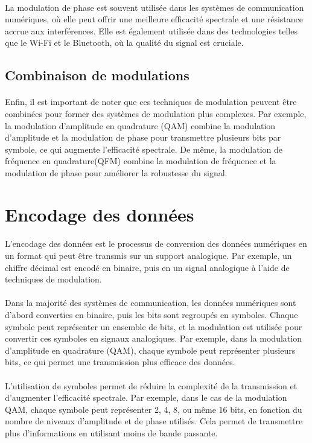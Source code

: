 \documentclass[a4paper,twocolumn]{report}
\begin{document}
\paragraph{}La modulation de phase est souvent utilisée dans les systèmes de communication numériques,
où elle peut offrir une meilleure efficacité spectrale et une résistance accrue aux interférences.
Elle est également utilisée dans des technologies telles que le Wi-Fi et le Bluetooth,
où la qualité du signal est cruciale.

\subsection{Combinaison de modulations}
\paragraph{}Enfin, il est important de noter que ces techniques de modulation peuvent
être combinées pour former des systèmes de modulation plus complexes.
Par exemple, la modulation d'amplitude en quadrature (QAM) combine la modulation
d'amplitude et la modulation de phase pour transmettre plusieurs bits par symbole,
ce qui augmente l'efficacité spectrale. De même, la modulation de fréquence en quadrature(QFM)
combine la modulation de fréquence et la modulation de phase pour améliorer la robustesse du signal.

\section{Encodage des données}

\paragraph{}L'encodage des données est le processus de conversion des données numériques
en un format qui peut être transmis sur un support analogique.
Par exemple, un chiffre décimal est encodé en binaire, puis en un signal 
analogique à l'aide de techniques de modulation.
\paragraph{}Dans la majorité des systèmes de communication, les données numériques
sont d'abord converties en binaire, puis les bits sont regroupés en symboles.
Chaque symbole peut représenter un ensemble de bits, et la modulation est utilisée
pour convertir ces symboles en signaux analogiques.
Par exemple, dans la modulation d'amplitude en quadrature (QAM), chaque symbole
peut représenter plusieurs bits, ce qui permet une transmission plus efficace des données.
\paragraph{}L'utilisation de symboles permet de réduire la complexité de la transmission
et d'augmenter l'efficacité spectrale. Par exemple, dans le cas de la modulation QAM,
chaque symbole peut représenter 2, 4, 8, ou même 16 bits, en fonction du nombre de 
niveaux d'amplitude et de phase utilisés. Cela permet de transmettre plus d'informations
en utilisant moins de bande passante.
\end{document}
